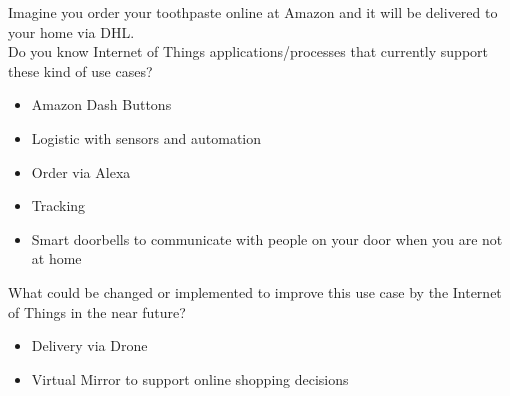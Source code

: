 \documentclass{article}
\begin{document}
Imagine you order your toothpaste online at Amazon and it will be delivered to your home via DHL.\\
Do you know Internet of Things applications/processes that currently support these kind of use cases?
\begin{itemize}
    \item Amazon Dash Buttons
    \item Logistic with sensors and automation
    \item Order via Alexa
    \item Tracking
    \item Smart doorbells to communicate with people on your door when you are not at home
\end{itemize}
What could be changed or implemented to improve this use case by the Internet of Things in the near future?
\begin{itemize}
    \item Delivery via Drone
    \item Virtual Mirror to support online shopping decisions
\end{itemize}
\end{document}
